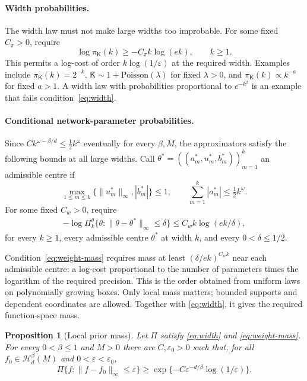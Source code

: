 \documentclass[11pt,a4paper]{article}
\newtheorem{proposition}{Proposition}
\theoremstyle{remark}
\newcommand{\Hcal}{\mathcal H}
\newcommand{\norm}[1]{\lVert#1\rVert}
\begin{document}
\paragraph{Width probabilities.}
The width law must not make large widths too improbable. For some
fixed $C_\pi>0$, require
\begin{equation}\label{eq:width}
\log\pi_{\mathsf K}(k)\geq -C_\pi k\log(ek),\qquad k\geq1.
\end{equation}
This permits a log-cost of order $k\log(1/\varepsilon)$ at the
required width. Examples include $\pi_{\mathsf K}(k)=2^{-k}$,
$\mathsf K\sim1+\mathrm{Poisson}(\lambda)$ for fixed $\lambda>0$,
and $\pi_{\mathsf K}(k)\propto k^{-a}$ for fixed $a>1$.
A width law with probabilities proportional to $e^{-k^2}$ is an example
that fails condition~\eqref{eq:width}.

\paragraph{Conditional network-parameter probabilities.}
Since $Ck^{\omega-\beta/d}\leq\tfrac12k^\omega$ eventually for
every $\beta,M$, the approximators satisfy the following bounds at
all large widths. Call $\theta^*=((a_m^*,u_m^*,b_m^*))_{m=1}^k$
an admissible centre if
\begin{equation}\label{eq:weight-centres}
\max_{1\leq m\leq k}\{\norm{u_m^*}_\infty,|b_m^*|\}\leq1,
\qquad \sum_{m=1}^k|a_m^*|\leq\tfrac12 k^\omega.
\end{equation}
For some fixed $C_w>0$, require
\begin{equation}\label{eq:weight-mass}
\begin{split}
-\log\Pi_k^\theta\{\theta:
\norm{\theta-\theta^*}_\infty\leq\delta\}
\leq C_w k\log(ek/\delta),
\end{split}
\end{equation}
for every $k\geq1$, every admissible centre $\theta^*$ at width $k$,
and every $0<\delta\leq1/2$.

Condition~\eqref{eq:weight-mass} requires mass at least
$(\delta/ek)^{C_wk}$ near each admissible centre: a log-cost
proportional to the number of parameters times the logarithm of the
required precision. This is the order obtained from uniform laws on
polynomially growing boxes. Only local mass matters; bounded supports
and dependent coordinates are allowed. Together with
\eqref{eq:width}, it gives the required function-space mass.

\begin{proposition}[Local prior mass]\label{prop:smallball}
Let $\Pi$ satisfy \eqref{eq:width} and \eqref{eq:weight-mass}. For
every $0<\beta\leq1$ and $M>0$ there are $C,\varepsilon_0>0$ such
that, for all $f_0\in\Hcal_d^\beta(M)$ and
$0<\varepsilon<\varepsilon_0$,
\begin{equation}\label{eq:smallball}
\Pi\{f:\norm{f-f_0}_\infty\leq\varepsilon\}
\geq\exp\{-C\varepsilon^{-d/\beta}\log(1/\varepsilon)\}.
\end{equation}
\end{proposition}
\end{document}
